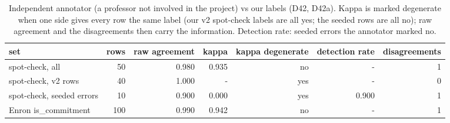 \begin{table}[t]
\centering
\small
\caption{Independent annotator (a professor not involved in the project) vs our labels (D42, D42a). Kappa is marked degenerate when one side gives every row the same label (our v2 spot-check labels are all yes; the seeded rows are all no); raw agreement and the disagreements then carry the information. Detection rate: seeded errors the annotator marked no.}
\label{tab:annotator_agreement}
\begin{tabular}{lrrrrrr}
\toprule
set & rows & raw agreement & kappa & kappa degenerate & detection rate & disagreements \\
\midrule
spot-check, all & 50 & 0.980 & 0.935 & no & - & 1 \\
spot-check, v2 rows & 40 & 1.000 & - & yes & - & 0 \\
spot-check, seeded errors & 10 & 0.900 & 0.000 & yes & 0.900 & 1 \\
Enron is\_commitment & 100 & 0.990 & 0.942 & no & - & 1 \\
\bottomrule
\end{tabular}
\end{table}

